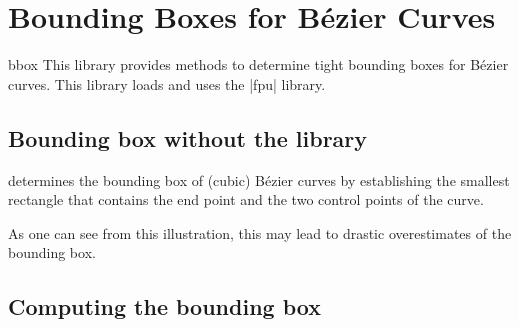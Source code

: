 %
%
%

\section{Bounding Boxes for Bézier Curves}

\begin{pgflibrary}{bbox}
    This library provides methods to determine tight bounding boxes for
    Bézier curves. This library loads and uses the |fpu| library.
\end{pgflibrary}


\subsection{Bounding box without the library}

\tikzname{} determines the bounding box of (cubic) Bézier curves by
establishing the smallest rectangle that contains the end point and the two
control points of the curve.
%
\begin{codeexample}[width=5cm]
\end{codeexample}

As one can see from this illustration, this may lead to drastic overestimates of
the bounding box.


\subsection{Computing the bounding box}

